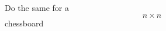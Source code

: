 \documentclass[preview]{standalone}
\begin{document}
\begin{center}
Do the same for a $$n \times n$$ chessboard
\end{center}
\end{document}
